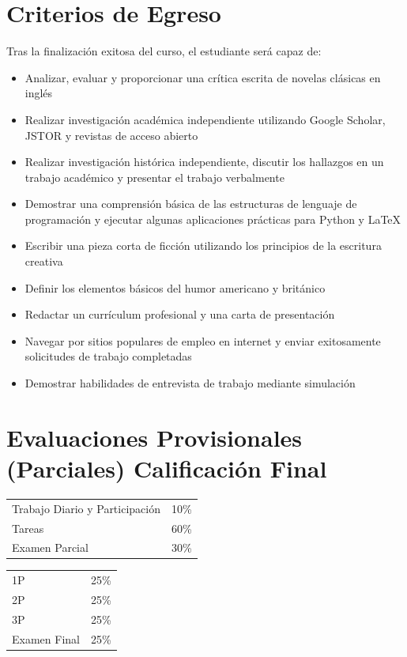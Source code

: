 \documentclass[12pt]{article}
\begin{document}
\section*{Criterios de Egreso}
Tras la finalización exitosa del curso, el estudiante será capaz de:
\begin{itemize}
    \item Analizar, evaluar y proporcionar una crítica escrita de novelas clásicas en inglés
    \item Realizar investigación académica independiente utilizando Google Scholar, JSTOR y revistas de acceso abierto
    \item Realizar investigación histórica independiente, discutir los hallazgos en un trabajo académico y presentar el trabajo verbalmente
    \item Demostrar una comprensión básica de las estructuras de lenguaje de programación y ejecutar algunas aplicaciones prácticas para Python y LaTeX
    \item Escribir una pieza corta de ficción utilizando los principios de la escritura creativa
    \item Definir los elementos básicos del humor americano y británico
    \item Redactar un currículum profesional y una carta de presentación
    \item Navegar por sitios populares de empleo en internet y enviar exitosamente solicitudes de trabajo completadas
    \item Demostrar habilidades de entrevista de trabajo mediante simulación
\end{itemize}

\section*{Evaluaciones Provisionales (Parciales) \hfill Calificación Final}
\noindent\begin{tabular}{ll}
    Trabajo Diario y Participación & 10\% \\
    Tareas & 60\% \\
    Examen Parcial & 30\% \\
\end{tabular}
\hfill
\begin{tabular}{ll}
    1P & 25\% \\
    2P & 25\% \\
    3P & 25\% \\
    Examen Final & 25\% \\
\end{tabular}
\end{document}
